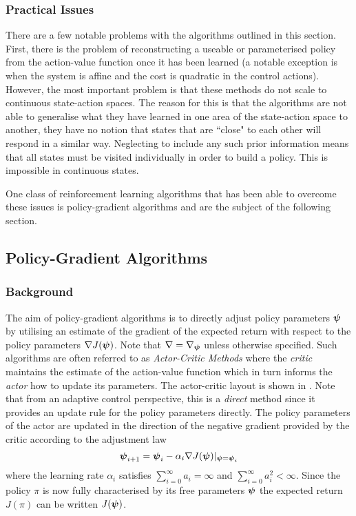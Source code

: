 \subsubsection{Practical Issues}
There are a few notable problems with the algorithms outlined in this section. First, there is the problem of reconstructing a useable or parameterised policy from the action-value function once it has been learned (a notable exception is when the system is affine and the cost is quadratic in the control actions). However, the most important problem is that these methods do not scale to continuous state-action spaces. The reason for this is that the algorithms are not able to generalise what they have learned in one area of the state-action space to another, they have no notion that states that are ``close" to each other will respond in a similar way. Neglecting to include any such prior information means that all states must be visited individually in order to build a policy. This is impossible in continuous states.


One class of reinforcement learning algorithms that has been able to overcome these issues is policy-gradient algorithms and are the subject of the following section.







\subsection{Policy-Gradient Algorithms}
\subsubsection{Background}
The aim of policy-gradient algorithms is to directly adjust policy parameters $\boldsymbol{\psi}$ by utilising an estimate of the gradient of the expected return with respect to the policy parameters $\nabla  J(\boldsymbol{\psi})$. Note that $\nabla = \nabla_{\boldsymbol{\psi}}$ unless otherwise specified. Such algorithms are often referred to as \textit{Actor-Critic Methods} where the \textit{critic} maintains the estimate of the action-value function which in turn informs the \textit{actor} how to update its parameters. The actor-critic layout is shown in . Note that from an adaptive control perspective, this is a \textit{direct} method since it provides an update rule for the policy parameters directly. The policy parameters of the actor are updated in the direction of the negative gradient provided by the critic according to the adjustment law
\begin{equation*}
\boldsymbol{\psi}_{i+1} = \boldsymbol{\psi}_{i} - \alpha_i \nabla J(\boldsymbol{\psi})|_{\boldsymbol{\psi}=\boldsymbol{\psi}_i}
\end{equation*}
where the learning rate $\alpha_i$ satisfies $\sum_{i=0}^{\infty} a_i = \infty$ and $\sum_{i=0}^{\infty} a_i^2 < \infty$. Since the policy $\pi$ is now fully characterised by its free parameters $\boldsymbol{\psi}$ the expected return $J(\pi)$ can be written $J(\boldsymbol{\psi})$.



